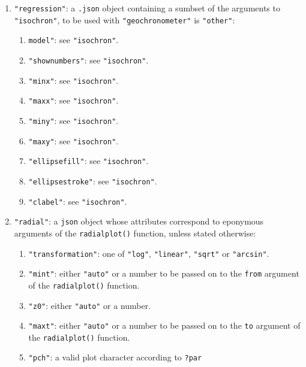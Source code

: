 \begin{refsection}
\begin{enumerate}[leftmargin=\parindent,align=left,
      labelwidth=\parindent,label*=2.\arabic*.]
\begin{enumerate}[leftmargin=\parindent,align=left,
      labelwidth=\parindent,label*=\arabic*.]
      \item{\tt "maxy"}: either \texttt{"auto"} or a number marking the
        second value of the \texttt{ylim} argument in the
        \texttt{isochron()} function.
      \item{\tt growth"}: logical. If \texttt{true}, adds a
        Stacey-Kramers growth curve to the plot.
  \end{enumerate}
\item{\tt "regression"}: a \texttt{.json} object containing a sumbset
  of the arguments to \texttt{"isochron"}, to be used with
  \texttt{"geochronometer"} is \texttt{"other"}:
  \begin{enumerate}[leftmargin=\parindent,align=left,
      labelwidth=\parindent,label*=\arabic*.]
  \item{\tt model"}: see \texttt{"isochron"}.
  \item{\tt "shownumbers"}: see \texttt{"isochron"}.
  \item{\tt "minx"}: see \texttt{"isochron"}.
  \item{\tt "maxx"}: see \texttt{"isochron"}.
  \item{\tt "miny"}: see \texttt{"isochron"}.
  \item{\tt "maxy"}: see \texttt{"isochron"}.
  \item{\tt "ellipsefill"}: see \texttt{"isochron"}.
  \item{\tt "ellipsestroke"}: see \texttt{"isochron"}.
  \item{\tt "clabel"}: see \texttt{"isochron"}.
  \end{enumerate}
\item{\tt "radial"}: a \texttt{json} object whose attributes
  correspond to eponymous arguments of the \texttt{radialplot()}
  function, unless stated otherwise:
  \begin{enumerate}[leftmargin=\parindent,align=left,
      labelwidth=\parindent,label*=\arabic*.]
  \item{\tt "transformation"}: one of \texttt{"log"},
    \texttt{"linear"}, \texttt{"sqrt"} or \texttt{"arcsin"}.
  \item{\tt "mint"}: either \texttt{"auto"} or a number to be passed
    on to the \texttt{from} argument of the \texttt{radialplot()}
    function.
  \item{\tt "z0"}: either \texttt{"auto"} or a number.
  \item{\tt "maxt"}: either \texttt{"auto"} or a number to be passed
    on to the \texttt{to} argument of the \texttt{radialplot()}
    function.
  \item{\tt "pch"}: a valid plot character according to \texttt{?par}

\end{enumerate}
\end{enumerate}
\end{refsection}
